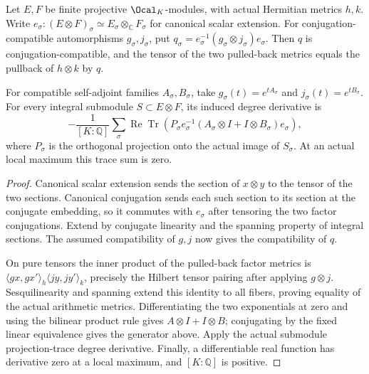 \begin{lemma}
\label{lem:tensor-metric-variation}
\leanok
Let $E,F$ be finite projective $\Ocal_K$-modules, with actual Hermitian
metrics $h,k$. Write $e_\sigma:(E\otimes F)_\sigma\simeq
E_\sigma\otimes_\mathbb C F_\sigma$ for canonical scalar extension.
For conjugation-compatible automorphisms $g_\sigma,j_\sigma$, put
$q_\sigma=e_\sigma^{-1}(g_\sigma\otimes j_\sigma)e_\sigma$.
Then $q$ is conjugation-compatible, and the tensor of the two pulled-back
metrics equals the pullback of $h\otimes k$ by $q$.

For compatible self-adjoint families $A_\sigma,B_\sigma$, take
$g_\sigma(t)=e^{tA_\sigma}$ and $j_\sigma(t)=e^{tB_\sigma}$. For every
integral submodule $S\subset E\otimes F$, its induced degree derivative is
\[
 -\frac1{[K:\mathbb Q]}\sum_\sigma
 \operatorname{Re}\operatorname{Tr}\left(P_\sigma
 e_\sigma^{-1}(A_\sigma\otimes I+I\otimes B_\sigma)e_\sigma\right),
\]
where $P_\sigma$ is the orthogonal projection onto the actual image of
$S_\sigma$. At an actual local maximum this trace sum is zero.
\end{lemma}
\begin{proof}
Canonical scalar extension sends the section of $x\otimes y$ to the
tensor of the two sections. Canonical conjugation sends each such
section to its section at the conjugate embedding, so it commutes with
$e_\sigma$ after tensoring the two factor conjugations. Extend by
conjugate linearity and the spanning property of integral sections.
The assumed compatibility of $g,j$ now gives the compatibility of $q$.

On pure tensors the inner product of the pulled-back factor metrics is
$\langle gx,gx'\rangle_h\langle jy,jy'\rangle_k$, precisely the
Hilbert tensor pairing after applying $g\otimes j$. Sesquilinearity and
spanning extend this identity to all fibers, proving equality of the
actual arithmetic metrics. Differentiating the two exponentials at zero
and using the bilinear product rule gives $A\otimes I+I\otimes B$;
conjugating by the fixed linear equivalence gives the generator above.
Apply the actual submodule projection-trace degree derivative. Finally,
a differentiable real function has derivative zero at a local maximum,
and $[K:\mathbb Q]$ is positive.
\end{proof}


